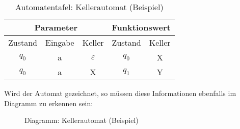 \begin{table}[h]
\centering
\begin{tabular}{|c|c|c||c|c|}
\hline
\multicolumn{3}{|c||}{Parameter} & \multicolumn{2}{c|}{Funktionswert} \\ \hline
Zustand   & Eingabe   & Keller  & Zustand          & Keller          \\ \hline
$q_0$       & a         & $\varepsilon$       & $q_0$              & X               \\ \hline
$q_0$       & a         & X       & $q_1$              & Y               \\ \hline
\end{tabular}
\caption{Automatentafel: Kellerautomat (Beispiel)}
\label{tbl:bspkeller}
\end{table}

Wird der Automat gezeichnet, so müssen diese Informationen ebenfalls im Diagramm zu erkennen sein:

\begin{figure}[H]
\centering
{}
\caption{Diagramm: Kellerautomat (Beispiel)
}\label{fig:bspkeller}
\end{figure}
